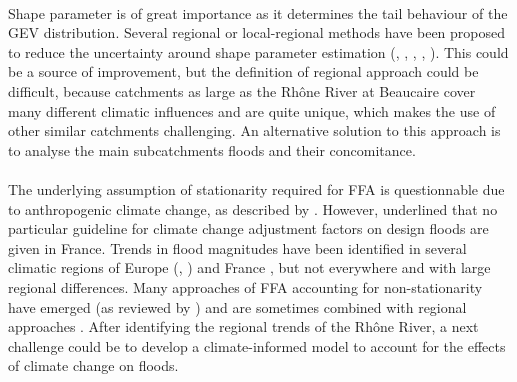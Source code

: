 \documentclass[11pt]{article}
\begin{document}
    \paragraph{}
    Shape parameter is of great importance as it determines the tail behaviour of the GEV distribution. Several regional or local-regional methods have been proposed to reduce the uncertainty around shape parameter estimation (\citet{burn_evaluation_1990}, \citet{ouarda_regional_2001}, \citet{ribatet_regional_2007}, \citet{micevski_combining_2009}, \citet{haddad_regional_2012}). This could be a source of improvement, but the definition of regional approach could be difficult, because catchments as large as the Rhône River at Beaucaire cover many different climatic influences and are quite unique, which makes the use of other similar catchments challenging. An alternative solution to this approach is to analyse the main subcatchments floods and their concomitance.
    \paragraph{}The underlying assumption of stationarity required for FFA is questionnable due to anthropogenic climate change, as described by \citet{milly_stationarity_2008}. However, \citet{madsen_review_2014} underlined that no particular guideline for climate change adjustment factors on design floods are given in France. Trends in flood magnitudes have been identified in several climatic regions of Europe (\citet{hall_understanding_2014}, \citet{bloschl_changing_2019}) and France \citep{giuntoli_floods_2019}, but not everywhere and with large regional differences. Many approaches of FFA accounting for non-stationarity have emerged (as reviewed by \citet{salas_techniques_2018}) and are sometimes combined with regional approaches \citep{han_incorporating_2022}. After identifying the regional trends of the Rhône River, a next challenge could be to develop a climate-informed model to account for the effects of climate change on floods.
    
\end{document}
